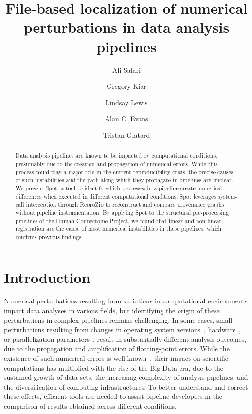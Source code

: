 \documentclass[a4paper,num-refs]{oup-contemporary}
\title{File-based localization of numerical perturbations in data analysis pipelines}
\newcommand{\revised}[1]{\color{blue}#1\color{black}\xspace}
\newcommand{\reprozip}[0]{ReproZip\xspace}
\newcommand{\toolname}[0]{Spot\xspace}
\begin{document}
\author[1]{Ali Salari}
\author[2,3]{Gregory Kiar}
\author[2]{Lindsay Lewis}
\author[2,3]{Alan C. Evans}
\author[1]{Tristan Glatard}


\maketitle

\begin{abstract}
Data analysis pipelines are known to be impacted by computational conditions, presumably due to the creation
and propagation of numerical errors. While this process could
play a major role in the current reproducibility crisis, the precise
causes of such instabilities and the path along which they propagate in
pipelines are unclear. We present \toolname, a tool to identify which
processes in a pipeline create numerical differences
when executed in different computational conditions. \toolname
leverages system-call interception through \reprozip to reconstruct and compare provenance
graphs without pipeline instrumentation. By applying \toolname to the
structural pre-processing pipelines of the Human Connectome
Project, we found that linear and non-linear registration are the cause of
most numerical instabilities in these pipelines, which confirms previous
findings.
\end{abstract}



\section{Introduction}


\revised{Numerical perturbations resulting from variations in computational
environments} impact data analyses in various fields, but identifying the
origin of these perturbations in complex pipelines remains challenging.  In
some cases, small perturbations resulting from changes in operating system
versions~\cite{Glatard2015}, hardware~\cite{jezequel2015estimation}, or
parallelization parameters~\cite{diethelm2011limits}, result in
substantially different analysis outcomes, \revised{due to the propagation
and amplification of floating-point errors. While the existence of such
numerical errors is well known~\cite{stoer2013introduction}, their impact
on scientific computations has multiplied with the rise of the Big Data
era, due to the sustained growth of data sets, the increasing complexity of
analysis pipelines, and the diversification of computing infrastructures.}
To better understand and
correct these effects, efficient tools are
needed to assist pipeline developers
in the comparison of results obtained across different conditions.
\end{document}
